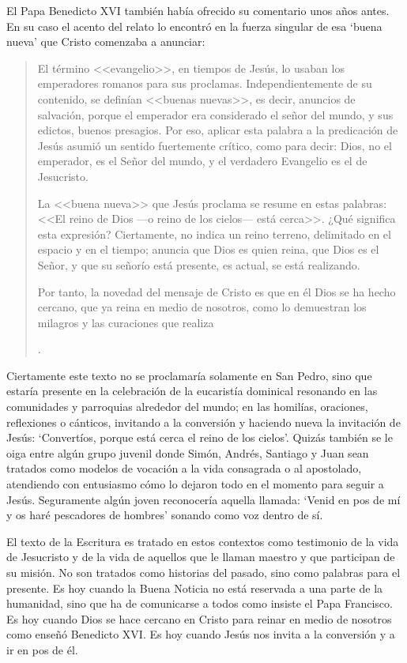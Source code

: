 El Papa Benedicto XVI también había ofrecido su comentario unos años antes. En su caso el acento del relato lo encontró en la fuerza singular de esa `buena nueva' que Cristo comenzaba a anunciar:
\blockquote[{\Cite{benedicto2008angelus}}.]{El término <<evangelio>>, en tiempos de Jesús, lo usaban los emperadores romanos para sus proclamas. Independientemente de su contenido, se definían <<buenas nuevas>>, es decir, anuncios de salvación, porque el emperador era considerado el señor del mundo, y sus edictos, buenos presagios. Por eso, aplicar esta palabra a la predicación de Jesús asumió un sentido fuertemente crítico, como para decir: Dios, no el emperador, es el Señor del mundo, y el verdadero Evangelio es el de Jesucristo.

La <<buena nueva>> que Jesús proclama se resume en estas palabras: <<El reino de Dios ---o reino de los cielos--- está cerca>>. ¿Qué significa esta expresión? Ciertamente, no indica un reino terreno, delimitado en el espacio y en el tiempo; anuncia que Dios es quien reina, que Dios es el Señor, y que su señorío está presente, es actual, se está realizando.

Por tanto, la novedad del mensaje de Cristo es que en él Dios se ha hecho cercano, que ya reina en medio de nosotros, como lo demuestran los milagros y las curaciones que realiza}.

Ciertamente este texto no se proclamaría solamente en San Pedro, sino que estaría presente en la celebración de la eucaristía dominical resonando en las comunidades y parroquias alrededor del mundo; en las homilías, oraciones, reflexiones o cánticos, invitando a la conversión y haciendo nueva la invitación de Jesús: \enquote*{Convertíos, porque está cerca el reino de los cielos}. Quizás también se le oiga entre algún grupo juvenil donde Simón, Andrés, Santiago y Juan sean tratados como modelos de vocación a la vida consagrada o al apostolado, atendiendo con entusiasmo cómo lo dejaron todo en el momento para seguir a Jesús. Seguramente algún joven reconocería aquella llamada: \enquote*{Venid en pos de mí y os haré pescadores de hombres} sonando como voz dentro de sí.

El texto de la Escritura es tratado en estos contextos como testimonio de la vida de Jesucristo y de la vida de aquellos que le llaman maestro y que participan de su misión. No son tratados como historias del pasado, sino como palabras para el presente. Es hoy cuando la Buena Noticia no está reservada a una parte de la humanidad, sino que ha de comunicarse a todos como insiste el Papa Francisco. Es hoy cuando Dios se hace cercano en Cristo para reinar en medio de nosotros como enseñó Benedicto XVI. Es hoy cuando Jesús nos invita a la conversión y a ir en pos de él.

